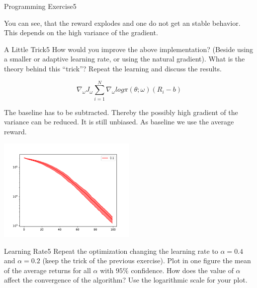 \begin{questions}
\begin{question}{Programming Exercise}{5}
\begin{answer}
You can see, that the reward explodes and one do not get an stable behavior. This depends on the high variance of the gradient.



	\end{answer}
\end{question}




\begin{question}{A Little Trick}{5}
	How would you improve the above implementation? (Beside using a smaller or adaptive learning rate, or using the natural gradient). What is the theory behind this ``trick''? Repeat the learning and discuss the results.
	
	\begin{answer}
	\begin{equation}
	\nabla_\omega J_\omega \sum_{i=1}^{N} \nabla_\omega log \pi (\theta; \omega)(R_i - b)
	\end{equation}
		
	The baseline has to be subtracted. Thereby the possibly high gradient of the variance can be reduced. It is still unbiased. As baseline we use the average reward.
	
	\begin{center}
		\includegraphics[width=0.5\textwidth]{img/PG-c.pdf}
	\end{center}

	
	
	\end{answer}

\end{question}
	


\begin{question}{Learning Rate}{5}
	Repeat the optimization changing the learning rate to $\alpha=0.4$ and $\alpha = 0.2$ (keep the trick of the previous exercise).
	Plot in one figure the mean of the average returns for all $\alpha$ with $95\%$ confidence.
	How does the value of $\alpha$ affect the convergence of the algorithm? 
	Use the logarithmic scale for your plot.
		

\end{question}
\end{questions}
